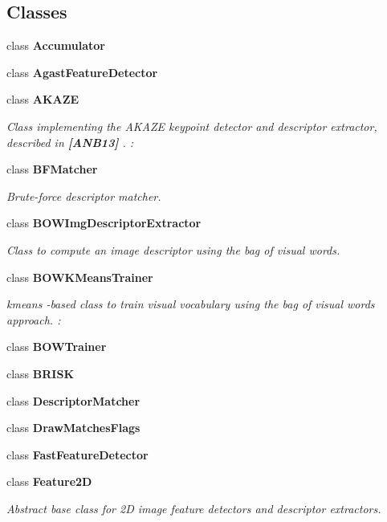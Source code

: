 \subsection*{Classes}
\begin{DoxyCompactItemize}
\item 
class {\bfseries Accumulator}
\item 
class {\bfseries Agast\+Feature\+Detector}
\item 
class {\bfseries A\+K\+A\+ZE}
\begin{DoxyCompactList}\small\item\em Class implementing the A\+K\+A\+ZE keypoint detector and descriptor extractor, described in {\bfseries [A\+N\+B13]} . \+: \end{DoxyCompactList}\item 
class {\bfseries B\+F\+Matcher}
\begin{DoxyCompactList}\small\item\em Brute-\/force descriptor matcher. \end{DoxyCompactList}\item 
class {\bfseries B\+O\+W\+Img\+Descriptor\+Extractor}
\begin{DoxyCompactList}\small\item\em Class to compute an image descriptor using the {\itshape bag of visual words}. \end{DoxyCompactList}\item 
class {\bfseries B\+O\+W\+K\+Means\+Trainer}
\begin{DoxyCompactList}\small\item\em kmeans -\/based class to train visual vocabulary using the {\itshape bag of visual words} approach. \+: \end{DoxyCompactList}\item 
class {\bfseries B\+O\+W\+Trainer}
\item 
class {\bfseries B\+R\+I\+SK}
\item 
class {\bfseries Descriptor\+Matcher}
\item 
class {\bfseries Draw\+Matches\+Flags}
\item 
class {\bfseries Fast\+Feature\+Detector}
\item 
class {\bfseries Feature2D}
\begin{DoxyCompactList}\small\item\em Abstract base class for 2D image feature detectors and descriptor extractors. \end{DoxyCompactList}\item 

\end{DoxyCompactItemize}
